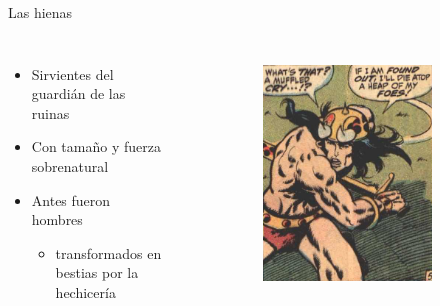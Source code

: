 \begin{frame}{Las hienas}
	\begin{columns}
		\begin{itemize}
			\item Sirvientes del guardián de las ruinas
			\item Con tamaño y fuerza sobrenatural
			\item Antes fueron hombres
			\begin{itemize}
				\item transformados en bestias por la hechicería
			\end{itemize}
		\end{itemize}
		\begin{figure}[htp]
			\centering
			\begin{subfigure}[b]{0.3\textwidth}
				\includegraphics[width=\textwidth]{img/conan/CTB}
			\end{subfigure}
			~
			\begin{subfigure}[b]{0.27\textwidth}

\end{subfigure}
\end{figure}
\end{columns}
\end{frame}
